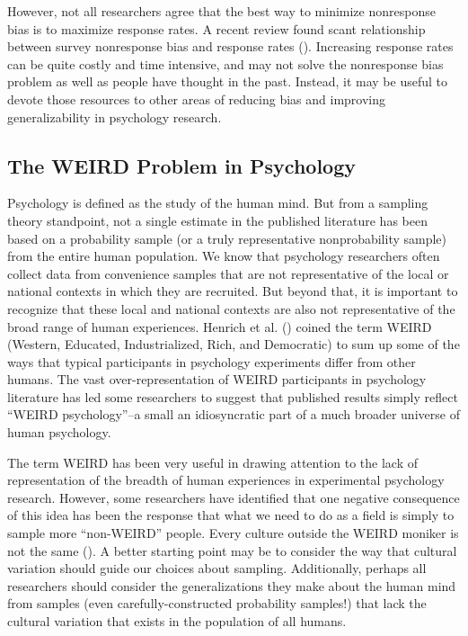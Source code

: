 \documentclass[
]{krantz}
\begin{document}
However, not all researchers agree that the best way to minimize nonresponse bias is to maximize response rates. A recent review found scant relationship between survey nonresponse bias and response rates (). Increasing response rates can be quite costly and time intensive, and may not solve the nonresponse bias problem as well as people have thought in the past. Instead, it may be useful to devote those resources to other areas of reducing bias and improving generalizability in psychology research.

\subsection*{The WEIRD Problem in Psychology}\label{the-weird-problem-in-psychology}


Psychology is defined as the study of the human mind. But from a sampling theory standpoint, not a single estimate in the published literature has been based on a probability sample (or a truly representative nonprobability sample) from the entire human population.
We know that psychology researchers often collect data from convenience samples that are not representative of the local or national contexts in which they are recruited. But beyond that, it is important to recognize that these local and national contexts are also not representative of the broad range of human experiences. Henrich et al. () coined the term WEIRD (Western, Educated, Industrialized, Rich, and Democratic) to sum up some of the ways that typical participants in psychology experiments differ from other humans. The vast over-representation of WEIRD participants in psychology literature has led some researchers to suggest that published results simply reflect ``WEIRD psychology''--a small an idiosyncratic part of a much broader universe of human psychology.

The term WEIRD has been very useful in drawing attention to the lack of representation of the breadth of human experiences in experimental psychology research. However, some researchers have identified that one negative consequence of this idea has been the response that what we need to do as a field is simply to sample more ``non-WEIRD'' people. Every culture outside the WEIRD moniker is not the same (). A better starting point may be to consider the way that cultural variation should guide our choices about sampling. Additionally, perhaps all researchers should consider the generalizations they make about the human mind from samples (even carefully-constructed probability samples!) that lack the cultural variation that exists in the population of all humans.
\end{document}
